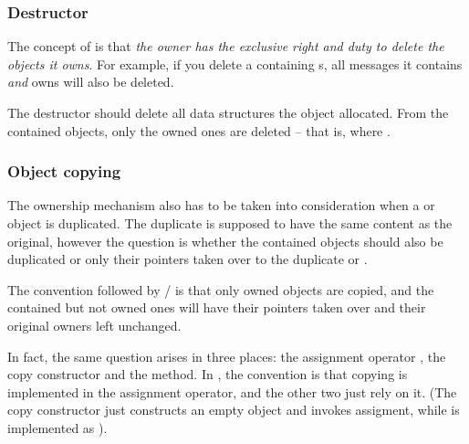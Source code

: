 \subsubsection{Destructor}

The concept of  is that \textit{the owner has the
exclusive right and duty to delete the objects it owns}.
For example, if you delete a  containing s,
all messages it contains \textit{and} owns will also be deleted.

The destructor should delete all data structures the object allocated.
From the contained objects, only the owned ones are deleted -- that is,
where .


\subsubsection{Object copying}

The ownership mechanism also has to be taken into consideration
when a  or  object is duplicated.
The duplicate is supposed to have the same content as the
original, however the question is whether the contained objects
should also be duplicated or only their pointers taken over
to the duplicate  or .

The convention followed by / is that
only owned objects are copied, and the contained but not owned ones
will have their pointers taken over and their original owners
left unchanged.

In fact, the same question arises in three places:
the assignment operator , the copy constructor
and the  method.
In {\opp}, the convention is that copying is implemented
in the assignment operator, and the other two just rely on it.
(The copy constructor just constructs an empty object and
invokes assigment, while 
is implemented as ).

%
%
%
%
%
%
%


